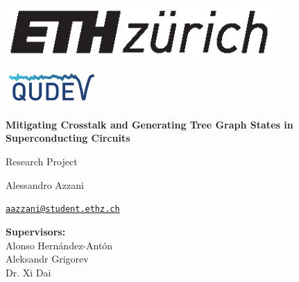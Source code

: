 \begin{titlepage}
    \noindent
    \begin{minipage}{0.4\textwidth}
        \begin{flushleft}
            \includegraphics[height=2.0cm]{Title/eth_logo.eps}
        \end{flushleft}
    \end{minipage}
    \hfill
    \begin{minipage}{0.4\textwidth}
        \begin{flushright}
            \includegraphics[height=1.3cm]{Title/Qudev_logo.pdf} %
        \end{flushright}
    \end{minipage}

    \vspace{3cm}

    \begin{center}
        \begin{spacing}{2.0}
            {\huge \bfseries Mitigating Crosstalk and Generating Tree Graph States in Superconducting Circuits}
        \end{spacing}

        \large
        Research Project {\MakeUppercase{}}
    \end{center}

    \vspace{1.2cm}

    \begin{center}
        \large
        Alessandro Azzani

        \begingroup
            \hypersetup{urlcolor=black}
            \href{mailto:aazzani@student.ethz.ch}
            {\texttt{\small aazzani@student.ethz.ch}} 
        \endgroup
    \end{center}

    \vfill

    \begin{center}
        \textbf{Supervisors:} \\
        Alonso Hernández-Antón \\
        Aleksandr Grigorev \\
        Dr. Xi Dai \\


\end{center}
\end{titlepage}
